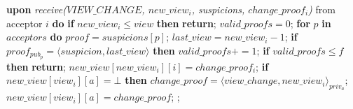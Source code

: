 \begin{algorithm}
\begin{algorithmic}[1]
		\State\textbf{upon} \textit{receive($VIEW\_CHANGE$, $new\_view_i$, suspicions, $change\_proof_i$)} from acceptor $i$ \textbf{do} 
		\State\hspace{\algorithmicindent} \textbf{if} $new\_view_i \leq view$ \textbf{then}
		\State\hspace{\algorithmicindent}\hspace{\algorithmicindent}\textbf{return};
		\State
		\State\hspace{\algorithmicindent} $valid\_proofs = 0$;
		\State\hspace{\algorithmicindent} \textbf{for} $p$ \textbf{in} $acceptors$ \textbf{do} 
		\State\hspace{\algorithmicindent}\hspace{\algorithmicindent} $proof = suspicions[p]$;
		\State\hspace{\algorithmicindent}\hspace{\algorithmicindent} $last\_view = new\_view_i-1$;
		\State\hspace{\algorithmicindent}\hspace{\algorithmicindent} \textbf{if} $proof_{pub_p} = \langle suspicion, last\_view \rangle$ \textbf{then}
		\State\hspace{\algorithmicindent}\hspace{\algorithmicindent}\hspace{\algorithmicindent} $valid\_proofs \mathrel{+{=}} 1$;
		\State
		\State\hspace{\algorithmicindent} \textbf{if} $valid\_proofs \leq f$ \textbf{then}
		\State\hspace{\algorithmicindent}\hspace{\algorithmicindent} \textbf{return};
		\State
		\State\hspace{\algorithmicindent} $new\_view[new\_view_i][i] = change\_proof_i$;
		\State\hspace{\algorithmicindent} \textbf{if} $new\_view[view_i][a] = \bot$ \textbf{then}				
		\State\hspace{\algorithmicindent}\hspace{\algorithmicindent} $change\_proof = \langle view\_change, new\_view_i \rangle_{priv_a}$;
		\State\hspace{\algorithmicindent}\hspace{\algorithmicindent} $new\_view[view_i][a] = change\_proof$;
		\State\hspace{\algorithmicindent}\hspace{\algorithmicindent}  ;

\end{algorithmic}
\end{algorithm}
